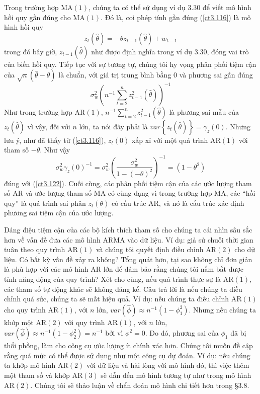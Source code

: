 \documentclass[12pt, a4paper,oneside]{book}
\theoremstyle{definition}
\begin{document}
Trong trường hợp MA$(1)$, chúng ta có thể sử dụng ví dụ 3.30 để viết mô hình hồi quy gần đúng cho MA$(1)$. Đó là, coi phép tính gần đúng (\ref{ct3.116}) là mô hình hồi quy
$$z_{t}(\hat{\theta})=-\theta z_{t-1}(\hat{\theta})+w_{t-1}  $$
trong đó bây giờ, $ z_{t-1}(\hat{\theta}) $ như được định nghĩa trong ví dụ 3.30, đóng vai trò của biến hồi quy.
Tiếp tục với sự tương tự, chúng tôi hy vọng phân phối tiệm cận của $ \sqrt{n}(\hat{\theta}-\theta) $ là chuẩn, với giá trị trung bình bằng 0 và phương sai gần đúng
$$ \sigma_{w}^2(n^{-1}\sum_{t=2}^{n}z^2_{t-1}(\hat{\theta}))^{-1} $$
Như trong trường hợp AR$(1)$, $ n^{-1}\sum_{t=2}^{n}z^2_{t-1}(\hat{\theta}) $ là phương sai mẫu của $ z_{t}(\hat{\theta}) $ vì vậy, đối với $ n $ lớn, ta nói đây phải là $var \left\lbrace z_{t}(\hat{\theta})\right\rbrace=\gamma_z(0)$. Nhưng lưu ý, như đã thấy từ (\ref{ct3.116}), $ z_t(0) $ xấp xỉ với một quá trình AR$(1)$ với tham số $ -\theta $. Như vậy
$$ \sigma_{w}^2\gamma_z(0)^{-1}=\sigma_{w}^2(\dfrac{\sigma_{w}^2}{1-(-\theta)^{2}})^{-1}=(1-\theta^{2}) $$
đúng với (\ref{ct3.122}). Cuối cùng, các phân phối tiệm cận của các ước lượng tham số AR và ước lượng tham số MA có cùng dạng vì trong trường hợp MA, các “hồi quy” là quá trình sai phân $ z_t(\theta) $ có cấu trúc AR, và nó là cấu trúc xác định phương sai tiệm cận của ước lượng.

Dáng điệu tiệm cận của các bộ kích thích tham số cho chúng ta cái nhìn sâu sắc hơn về vấn đề đưa các mô hình ARMA vào dữ liệu. Ví dụ: giả sử chuỗi thời gian tuân theo quy trình AR$(1)$ và chúng tôi quyết định điều chỉnh AR$(2)$ cho dữ liệu. Có bất kỳ vấn đề xảy ra không? Tổng quát hơn, tại sao không chỉ đơn giản là phù hợp với các mô hình AR lớn để đảm bảo rằng chúng tôi nắm bắt được tính năng động của quy trình? Xét cho cùng, nếu quá trình thực sự là AR$(1)$, các tham số tự động khác sẽ không đáng kể. Câu trả lời là nếu chúng ta điều chỉnh quá sức, chúng ta sẽ mất hiệu quả. Ví dụ: nếu chúng ta điều chỉnh AR$(1)$ cho quy trình AR$(1)$, với $ n $ lớn, $ var(\hat{\phi})\approx n^{-1}(1-\phi^{2}_{1}) $. Nhưng nếu chúng ta khớp một AR$(2)$ với quy trình AR$(1)$, với $ n $ lớn, $ var(\hat{\phi})\approx n^{-1}(1-\phi^{2}_{2})=n^{-1} $ bởi vì $\phi^{2}=0$. Do đó, phương sai của $\phi_{1}$ đã bị thổi phồng, làm cho công cụ ước lượng ít chính xác hơn. Chúng tôi muốn đề cập rằng quá mức có thể được sử dụng như một công cụ dự đoán. Ví dụ: nếu chúng ta khớp mô hình AR$(2)$ với dữ liệu và hài lòng với mô hình đó, thì việc thêm một tham số và khớp AR$(3)$ sẽ dẫn đến mô hình tương tự như trong mô hình AR$(2)$. Chúng tôi sẽ thảo luận về chẩn đoán mô hình chi tiết hơn trong §3.8.
\end{document}
